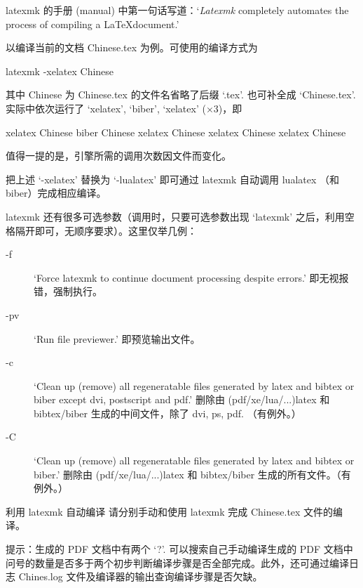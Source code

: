 latexmk 的手册 (manual)\cite{latexmk} 中第一句话写道：`\emph{Latexmk} completely automates the process of compiling a \LaTeX document.'

以编译当前的文档 Chinese.tex 为例。可使用的编译方式为
\begin{bashlst}
latexmk -xelatex Chinese
\end{bashlst}
其中 Chinese 为 Chinese.tex 的文件名省略了后缀 `.tex'. 也可补全成 `Chinese.tex'. 实际中依次运行了 `xelatex', `biber', `xelatex' ($\times 3$)，即
\begin{bashlst}[numbers=left]
xelatex Chinese
biber Chinese
xelatex Chinese
xelatex Chinese
xelatex Chinese
\end{bashlst}
值得一提的是，引擎所需的调用次数因文件而变化。

把上述 `-xelatex' 替换为 `-lualatex' 即可通过 latexmk 自动调用 lualatex （和 biber）完成相应编译。

latexmk 还有很多可选参数（调用时，只要可选参数出现 `latexmk' 之后，利用空格隔开即可，无顺序要求）。这里仅举几例：
\begin{description}
\item[-f] `Force latexmk to continue document processing despite errors.' 即无视报错，强制执行。
\item[-pv] `Run file previewer.' 即预览输出文件。
\item[-c] `Clean up (remove) all regeneratable files generated by latex and bibtex or biber except dvi, postscript and pdf.' 删除由 (pdf/xe/lua/...)latex 和 bibtex/biber 生成的中间文件，除了 dvi, ps, pdf. （有例外。）
\item[-C] `Clean up (remove) all regeneratable files generated by latex and bibtex or biber.' 删除由 (pdf/xe/lua/...)latex 和 bibtex/biber 生成的所有文件。（有例外。）
\end{description}

\begin{Ex}{利用 latexmk 自动编译}
请分别手动和使用 latexmk 完成 Chinese.tex 文件的编译。

提示：生成的 PDF 文档中有两个 `?'. 可以搜索自己手动编译生成的 PDF 文档中问号的数量是否多于两个初步判断编译步骤是否全部完成。此外，还可通过编译日志 Chines.log 文件及编译器的输出查询编译步骤是否欠缺。
\end{Ex}